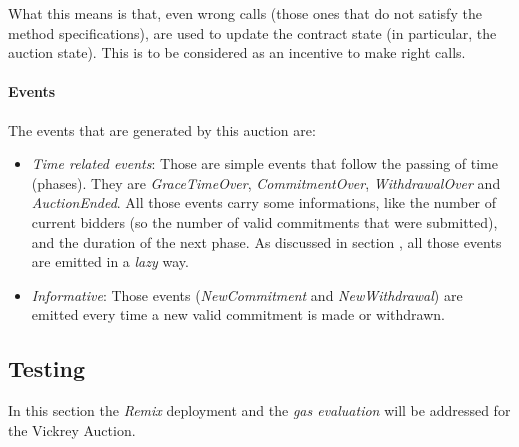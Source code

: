 \documentclass[11pt, a4paper]{report}
\begin{document}
	What this means is that, even wrong calls (those ones that do not satisfy the method specifications), are used to update the contract state (in particular, the auction state). This is to be considered as an incentive to make right calls. 

	\paragraph*{Events}
	The events that are generated by this auction are:
	\begin{itemize}
		\item \emph{Time related events}: Those are simple events that follow the passing of time (phases). They are \emph{GraceTimeOver}, \emph{CommitmentOver}, \emph{WithdrawalOver} and \emph{AuctionEnded}. All those events carry some informations, like the number of current bidders (so the number of valid commitments that were submitted), and the duration of the next phase. As discussed in section , all those events are emitted in a \emph{lazy} way.
		\item \emph{Informative}: Those events (\emph{NewCommitment} and \emph{NewWithdrawal}) are emitted every time a new valid commitment is made or withdrawn.
	\end{itemize}
	
	\subsection*{Testing}
	In this section the \emph{Remix} deployment and the \emph{gas evaluation} will be addressed for the Vickrey Auction. \\ 

	
\end{document}
